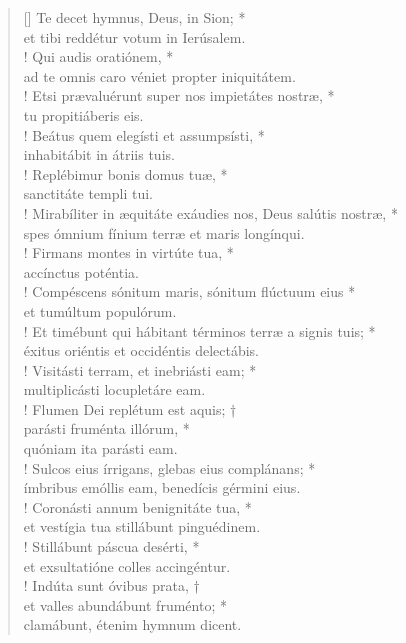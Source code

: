 \begin{verse}[\versewidth]
Te decet hymnus, Deus, in Sion; *\\
et tibi reddétur votum in Ierúsalem.\\!
\vin Qui audis oratiónem, *\\
\vin ad te omnis caro véniet propter iniquitátem.\\!
Etsi prævaluérunt super nos impietátes nostræ, *\\
tu propitiáberis eis.\\!
\vin Beátus quem elegísti et assumpsísti, *\\
\vin inhabitábit in átriis tuis.\\!
Replébimur bonis domus tuæ, *\\
sanctitáte templi tui.\\!
\vin Mirabíliter in æquitáte exáudies nos, Deus salútis nostræ, *\\
\vin spes ómnium fínium terræ et maris longínqui.\\!
Firmans montes in virtúte tua, *\\
accínctus poténtia.\\!
\vin Compéscens sónitum maris, sónitum flúctuum eius *\\
\vin et tumúltum populórum.\\!
Et timébunt qui hábitant términos terræ a signis tuis; *\\
éxitus oriéntis et occidéntis delectábis.\\!
\vin Visitásti terram, et inebriásti eam; *\\
\vin multiplicásti locupletáre eam.\\!
Flumen Dei replétum est aquis; †\\
parásti fruménta illórum, *\\
quóniam ita parásti eam.\\!
\vin Sulcos eius írrigans, glebas eius complánans; *\\
\vin ímbribus emóllis eam, benedícis gérmini eius.\\!
Coronásti annum benignitáte tua, *\\
et vestígia tua stillábunt pinguédinem.\\!
\vin Stillábunt páscua desérti, *\\
\vin et exsultatióne colles accingéntur.\\!
Indúta sunt óvibus prata, †\\
et valles abundábunt fruménto; *\\
clamábunt, étenim hymnum dicent.\\
\end{verse}
\vspace{1cm}


